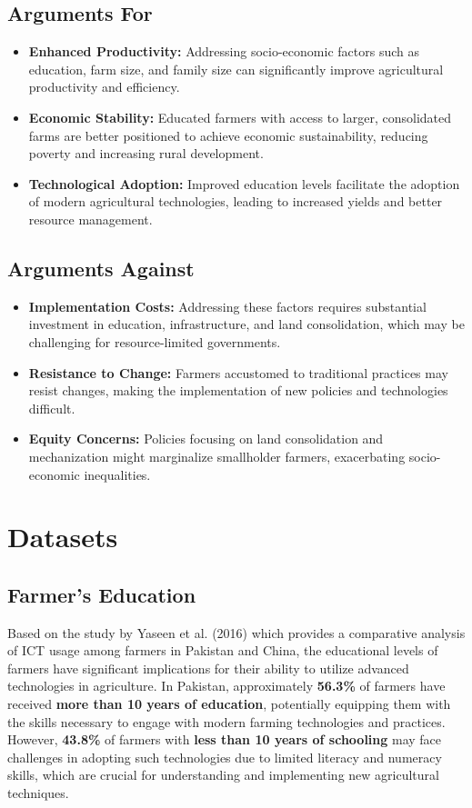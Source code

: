 \documentclass[12pt]{article}
\begin{document}
\subsection*{Arguments For}
\begin{itemize}
    \item \textbf{Enhanced Productivity:} Addressing socio-economic factors such as education, farm size, and family size can significantly improve agricultural productivity and efficiency.
    \item \textbf{Economic Stability:} Educated farmers with access to larger, consolidated farms are better positioned to achieve economic sustainability, reducing poverty and increasing rural development.
    \item \textbf{Technological Adoption:} Improved education levels facilitate the adoption of modern agricultural technologies, leading to increased yields and better resource management.
\end{itemize}

\subsection*{Arguments Against}
\begin{itemize}
    \item \textbf{Implementation Costs:} Addressing these factors requires substantial investment in education, infrastructure, and land consolidation, which may be challenging for resource-limited governments.
    \item \textbf{Resistance to Change:} Farmers accustomed to traditional practices may resist changes, making the implementation of new policies and technologies difficult.
    \item \textbf{Equity Concerns:} Policies focusing on land consolidation and mechanization might marginalize smallholder farmers, exacerbating socio-economic inequalities.
\end{itemize}

\section{Datasets}
\subsection{Farmer's Education}
Based on the study by Yaseen et al. (2016) which provides a comparative analysis of ICT usage among farmers in Pakistan and China, the educational levels of farmers have significant implications for their ability to utilize advanced technologies in agriculture. In Pakistan, approximately \textbf{56.3\%} of farmers have received \textbf{more than 10 years of education}, potentially equipping them with the skills necessary to engage with modern farming technologies and practices. However, \textbf{43.8\%} of farmers with \textbf{less than 10 years of schooling} may face challenges in adopting such technologies due to limited literacy and numeracy skills, which are crucial for understanding and implementing new agricultural techniques.
\end{document}
